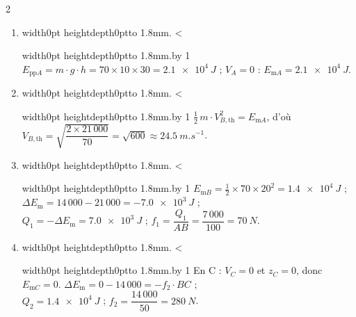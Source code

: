\documentclass[11pt,a4paper]{article}
\newif\ifeleve
\newlength{\interligne}\setlength{\interligne}{7mm}
\newlength{\replen}
\newcommand{\pointilles}{{\color{cInk2!60}\leaders\hbox to 1.8mm{\hss.\hss}\hfill}\kern0pt}
\newcommand{\lignes}[1]{\leavevmode\vrule width0pt height\dimexpr\interligne-1mm\relax depth0pt\pointilles
  \lgn=1 \loop\ifnum\lgn<#1 \par\nointerlineskip\noindent\vrule width0pt height\interligne depth0pt\pointilles\advance\lgn by 1 \repeat}
\newcommand{\rep}[1]{%
  \ifeleve
    \sbox{\repbox}{\parbox{\linewidth}{#1}}%
    \replen=\dimexpr\ht\repbox+\dp\repbox\relax
    \repn=\numexpr\replen/\baselineskip+1\relax
    \ifnum\repn<2 \repn=2\fi
    \edef\nblignes{\the\repn}\lignes{\nblignes}%
  \else #1\fi}
\newcommand{\Em}{E_{\mathrm{m}}}
\newcommand{\Eppi}[1]{E_{\mathrm{pp}#1}}
\newcommand{\Emi}[1]{E_{\mathrm{m}#1}}
\begin{document}
\begin{multicols}{2}
\begin{enumerate}[label={\sffamily\bfseries\arabic*.},leftmargin=5mm,itemsep=1pt]
  \item \rep{$\Eppi{A} = m\cdot g\cdot h = 70\times10\times30 = \qty{2,1e4}{J}$ ; $V_A = 0$ : $\Emi{A} = \qty{2,1e4}{J}$.}
  \item \rep{$\frac{1}{2}\,m\cdot V_{B,\mathrm{th}}^2 = \Emi{A}$, d’où $V_{B,\mathrm{th}} = \sqrt{\dfrac{2\times21\,000}{70}} = \sqrt{600} \approx \qty{24,5}{m.s^{-1}}$.}
  \item \rep{$\Emi{B} = \frac{1}{2}\times70\times20^2 = \qty{1,4e4}{J}$ ; $\Delta\Em = 14\,000 - 21\,000 = \qty{-7,0e3}{J}$ ;\\ $Q_1 = -\Delta\Em = \qty{7,0e3}{J}$ ; $f_1 = \dfrac{Q_1}{AB} = \dfrac{7\,000}{100} = \qty{70}{N}$.}
  \item \rep{En C : $V_C = 0$ et $z_C = 0$, donc $\Emi{C} = 0$. $\Delta\Em = 0 - 14\,000 = -f_2\cdot BC$ ;\\ $Q_2 = \qty{1,4e4}{J}$ ; $f_2 = \dfrac{14\,000}{50} = \qty{280}{N}$.}
\end{enumerate}
\end{multicols}
\end{document}

